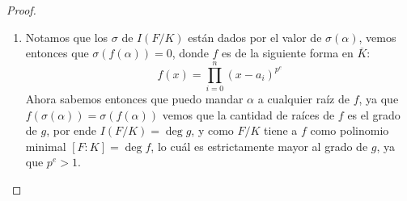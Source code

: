 \documentclass[11pt]{article}
\begin{document}
\begin{enumerate}[label=(\arabic*)]
\begin{proof}
\begin{enumerate}[label=(\alph*)]
                \item Notamos que los $\sigma$ de $I(F/K)$ están dados por el valor de $\sigma(\alpha)$, vemos entonces que $\sigma(f(\alpha))=0$, donde $f$ es de la siguiente forma en $\overline{K}$:
                \[f(x)=\prod^n_{i=0}(x-a_i)^{p^e}\]
                Ahora sabemos entonces que puedo mandar $\alpha$ a cualquier raíz de $f$, ya que $f(\sigma(\alpha))=\sigma(f(\alpha))$ vemos que la cantidad de raíces de $f$ es el grado de $g$, por ende $I(F/K)=\deg g$, y como $F/K$ tiene a $f$ como polinomio minimal $[F:K]=\deg f$, lo cuál es estrictamente mayor al grado de $g$, ya que $p^e>1$.
            \end{enumerate}
        \end{proof}

    \end{enumerate}
\end{document}
